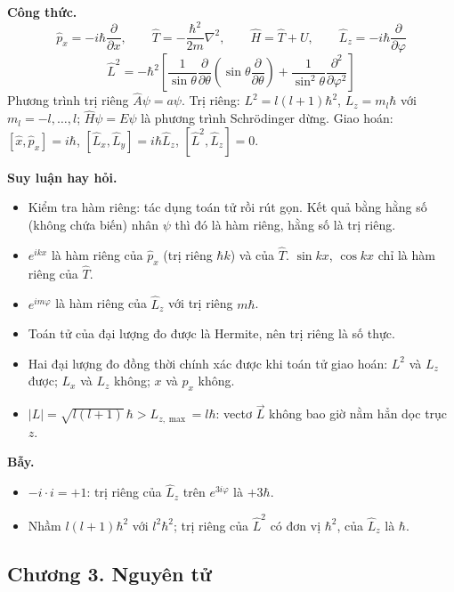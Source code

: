 \documentclass[11pt,a4paper]{article}
\begin{document}
\textbf{Công thức.}
\begin{equation*}
    \hat p_x=-i\hbar\frac{\partial}{\partial x},\qquad \hat T=-\frac{\hbar^2}{2m}\nabla^2,\qquad \hat H=\hat T+U,\qquad \hat L_z=-i\hbar\frac{\partial}{\partial\varphi}
\end{equation*}
\begin{equation*}
    \hat L^2=-\hbar^2\left[\frac1{\sin\theta}\frac{\partial}{\partial\theta}\left(\sin\theta\frac{\partial}{\partial\theta}\right)+\frac1{\sin^2\theta}\frac{\partial^2}{\partial\varphi^2}\right]
\end{equation*}
Phương trình trị riêng $\hat A\psi=a\psi$. Trị riêng: $L^2=l(l+1)\hbar^2$, $L_z=m_l\hbar$ với $m_l=-l,\dots,l$; $\hat H\psi=E\psi$ là phương trình Schrödinger dừng. Giao hoán: $[\hat x,\hat p_x]=i\hbar$, $[\hat L_x,\hat L_y]=i\hbar\hat L_z$, $[\hat L^2,\hat L_z]=0$.

\textbf{Suy luận hay hỏi.}
\begin{itemize}
    \item Kiểm tra hàm riêng: tác dụng toán tử rồi rút gọn. Kết quả bằng hằng số (không chứa biến) nhân $\psi$ thì đó là hàm riêng, hằng số là trị riêng.
    \item $e^{ikx}$ là hàm riêng của $\hat p_x$ (trị riêng $\hbar k$) và của $\hat T$. $\sin kx$, $\cos kx$ chỉ là hàm riêng của $\hat T$.
    \item $e^{im\varphi}$ là hàm riêng của $\hat L_z$ với trị riêng $m\hbar$.
    \item Toán tử của đại lượng đo được là Hermite, nên trị riêng là số thực.
    \item Hai đại lượng đo đồng thời chính xác được khi toán tử giao hoán: $L^2$ và $L_z$ được; $L_x$ và $L_z$ không; $x$ và $p_x$ không.
    \item $|L|=\sqrt{l(l+1)}\,\hbar>L_{z,\max}=l\hbar$: vectơ $\vec L$ không bao giờ nằm hẳn dọc trục $z$.
\end{itemize}

\textbf{Bẫy.}
\begin{itemize}
    \item $-i\cdot i=+1$: trị riêng của $\hat L_z$ trên $e^{3i\varphi}$ là $+3\hbar$.
    \item Nhầm $l(l+1)\hbar^2$ với $l^2\hbar^2$; trị riêng của $\hat L^2$ có đơn vị $\hbar^2$, của $\hat L_z$ là $\hbar$.
\end{itemize}

\subsection*{Chương 3. Nguyên tử}
\end{document}
